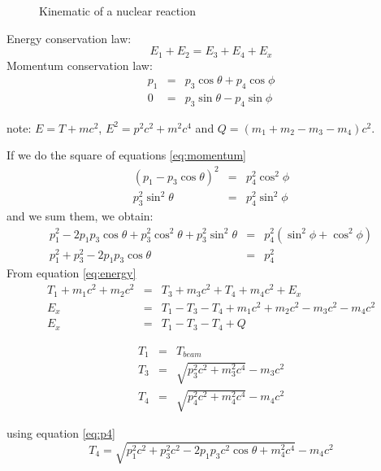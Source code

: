 \documentclass[11pt]{report}
\begin{document}
\begin{figure}
	\centerline{\vspace{0cm}\hspace{0cm}
	}
	\caption{Kinematic of a nuclear reaction}
	\label{fig:scattering}
\end{figure}


Energy conservation law:
\begin{equation}
E_1 + E_2 = E_3 + E_4 + E_x
\label{eq:energy}
\end{equation}
Momentum conservation law:
\begin{eqnarray}
p_1 &=& p_3\cos\theta + p_4\cos\phi\nonumber\\
0 &=& p_3\sin\theta - p_4\sin\phi
\label{eq:momentum}
\end{eqnarray}

note: $E =T + mc^2$, $E^2 = p^2c^2 + m^2c^4$ and $Q = (m_1 + m_2 - m_3 - m_4)c^2$.

If we do the square of equations \ref{eq:momentum} 
\begin{eqnarray}
(p_1- p_3\cos\theta)^2 &=&  p_4^2\cos^2\phi\nonumber\\
p_3^2\sin^2\theta &=& p_4^2\sin^2\phi\nonumber
\end{eqnarray}
and we sum them, we obtain:
\begin{eqnarray}
p_1^2 - 2p_1p_3\cos\theta + p_3^2\cos^2\theta + p_3^2\sin^2\theta &=&  p_4^2(\sin^2\phi +\cos^2\phi)\nonumber\\
p_1^2 + p_3^2 - 2p_1p_3\cos\theta &=& p_4^2
\label{eq:p4}
\end{eqnarray}
From equation \ref{eq:energy}
\begin{eqnarray}
T_1 + m_1c^2 + m_2c^2 &=& T_3 + m_3c^2 + T_4 + m_4c^2 + E_x\\
E_x &=& T_1 - T_3 - T_4 + m_1c^2 + m_2c^2 - m_3c^2 - m_4c^2 \nonumber\\
E_x &=& T_1 - T_3 - T_4 + Q
\end{eqnarray}

\begin{eqnarray}
T_1 &=& T_{beam}\nonumber\\
T_3 &=& \sqrt{p^2_3c^2+m_3^2c^4} - m_3c^2\nonumber\\
T_4 &=& \sqrt{p^2_4c^2+m_4^2c^4} - m_4c^2
\end{eqnarray}

using equation \ref{eq:p4}
\begin{equation}
T_4 = \sqrt{p_1^2c^2 + p_3^2c^2 - 2p_1p_3c^2\cos\theta+m_4^2c^4} - m_4c^2
\end{equation}
\end{document}
